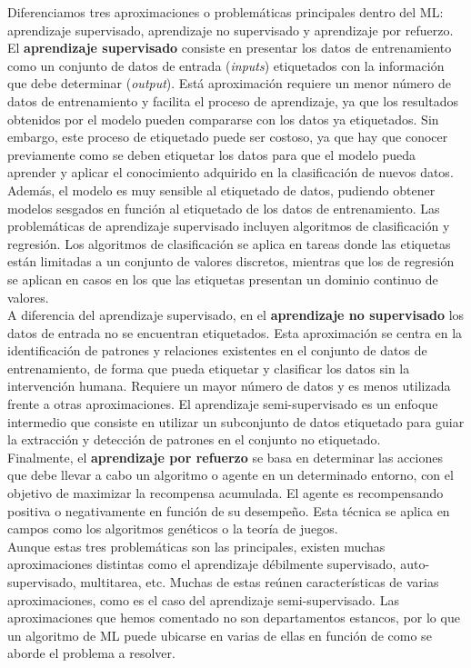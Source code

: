 Diferenciamos tres aproximaciones o problemáticas principales dentro del ML: aprendizaje supervisado, aprendizaje no supervisado y aprendizaje por refuerzo.\\
\newpage
El \textbf{aprendizaje supervisado} consiste en presentar los datos de entrenamiento como un conjunto de datos de entrada (\textit{inputs}) etiquetados con la información que debe determinar (\textit{output}). Está aproximación requiere un menor número de datos de entrenamiento y facilita el proceso de aprendizaje, ya que los resultados obtenidos por el modelo pueden compararse con los datos ya etiquetados. Sin embargo, este proceso de etiquetado puede ser costoso, ya que hay que conocer previamente como se deben etiquetar los datos para que el modelo pueda aprender y aplicar el conocimiento adquirido en la clasificación de nuevos datos. Además, el modelo es muy sensible al etiquetado de datos, pudiendo obtener modelos sesgados en función al etiquetado de los datos de entrenamiento.
Las problemáticas de aprendizaje supervisado incluyen algoritmos de clasificación y regresión. Los algoritmos de clasificación se aplica en tareas donde las etiquetas están limitadas a un conjunto de valores discretos, mientras que los de regresión se aplican en casos en los que las etiquetas presentan un dominio continuo de valores.\\

A diferencia del aprendizaje supervisado, en el \textbf{aprendizaje no supervisado} los datos de entrada no se encuentran etiquetados. Esta aproximación se centra en la identificación de patrones y relaciones existentes en el conjunto de datos de entrenamiento, de forma que pueda etiquetar y clasificar los datos sin la intervención humana. Requiere un mayor número de datos y es menos utilizada frente a otras aproximaciones. El aprendizaje semi-supervisado es un enfoque intermedio que consiste en utilizar un subconjunto de datos etiquetado para guiar la extracción y detección de patrones en el conjunto no etiquetado.\\

Finalmente, el \textbf{aprendizaje por refuerzo} se basa en determinar las acciones que debe llevar a cabo un algoritmo o agente en un determinado entorno, con el objetivo de maximizar la recompensa acumulada. El agente es recompensando positiva o negativamente en función de su desempeño. Esta técnica se aplica en campos como los algoritmos genéticos o la teoría de juegos.\\

Aunque estas tres problemáticas son las principales, existen muchas aproximaciones distintas como el aprendizaje débilmente supervisado, auto-supervisado, multitarea, etc. Muchas de estas reúnen características de varias aproximaciones, como es el caso del aprendizaje semi-supervisado. Las aproximaciones que hemos comentado no son departamentos estancos, por lo que un algoritmo de ML puede ubicarse en varias de ellas en función de como se aborde el problema a resolver.
\newpage
